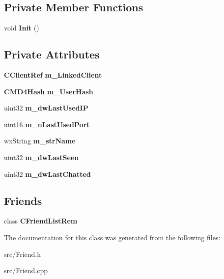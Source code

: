 \subsection*{Private Member Functions}
\begin{DoxyCompactItemize}
\item 
void {\bfseries Init} ()\label{classCFriend_aff3a816ecb3bf71f58d8a358fe4c6f3e}

\end{DoxyCompactItemize}
\subsection*{Private Attributes}
\begin{DoxyCompactItemize}
\item 
{\bf CClientRef} {\bfseries m\_\-LinkedClient}\label{classCFriend_a778fa59bf923ce964272162f108c0623}

\item 
{\bf CMD4Hash} {\bfseries m\_\-UserHash}\label{classCFriend_a19731e99fd98e8fc0bb8cfa14727df96}

\item 
uint32 {\bfseries m\_\-dwLastUsedIP}\label{classCFriend_aa17852a9662ece66ff6dcb3e769cbaec}

\item 
uint16 {\bfseries m\_\-nLastUsedPort}\label{classCFriend_a89ac1fc7a4f1261a59c98343c7c5eed5}

\item 
wxString {\bfseries m\_\-strName}\label{classCFriend_ac879b31ff5d2a7cd4d9b493ef3017151}

\item 
uint32 {\bfseries m\_\-dwLastSeen}\label{classCFriend_a388c6c3983fdd7f4c573696f5d13b2a8}

\item 
uint32 {\bfseries m\_\-dwLastChatted}\label{classCFriend_a971b9f6b719fc9caab0d7a71de97e205}

\end{DoxyCompactItemize}
\subsection*{Friends}
\begin{DoxyCompactItemize}
\item 
class {\bf CFriendListRem}\label{classCFriend_a9af1fcd206f7b0d725482ede402c4500}

\end{DoxyCompactItemize}


The documentation for this class was generated from the following files:\begin{DoxyCompactItemize}
\item 
src/Friend.h\item 
src/Friend.cpp\end{DoxyCompactItemize}
